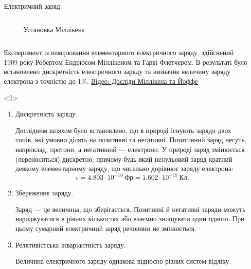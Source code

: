 \documentclass{beamer}
\begin{document}
\begin{frame}{Електричний заряд}
\begin{onlyenv}
\begin{columns}
\begin{column}{0.4\linewidth}
\begin{figure}
					\caption{Установка Міллікена}
				\end{figure}
			\end{column}
		\end{columns}
		\begin{block}{}\justifying\scriptsize
			Експеримент із вимірювання елементарного електричного заряду,
			здійснений 1909 року Робертом Ендрюсом Міллікеном та Гарві
			Флетчером. В результаті було встановлено дискретність електричного
			заряду та визначив величину заряду електрона з точністю до 1\%.
			\href{https://www.youtube.com/watch?v=5LC4-ct_1-M}{\scriptsize
				Відео: Досліди Міллікена та Йоффе}
		\end{block}
	\end{onlyenv}

	\begin{onlyenv}
		\begin{enumerate}\justifying
			\item Дискретність заряду.

			      \begin{flushleft}\scriptsize
				      Дослідним шляхом було встановлено, що в природі існують \alert{заряди двох типів}, які умовно ділять на \alert{позитивні} та
				      \alert{негативні}. Позитивний заряд несуть, наприклад, протони, а негативний --- електрони. У природі заряд змінюється (переноситься)
				      дискретно, причому будь-який ненульовий заряд кратний деякому елементарному заряду, що чисельно дорівнює заряду електрона:
				      \begin{equation*}
					      e = 4.803 \cdot 10^{-10}\ \text{Фр} = 1.602 \cdot 10^{-19}\ \text{Кл}.
				      \end{equation*}
			      \end{flushleft}

			\item Збереження заряду.

			      \begin{flushleft}\scriptsize
				      Заряд --- це величина, що \alert{зберігається}. Позитивні й негативні заряди можуть народжуватися в рівних кількостях або взаємно
				      знищувати один одного. При цьому сумарний електричний заряд речовини не змінюється.
			      \end{flushleft}
			\item Релятивістська інваріантність заряду.

			      \begin{flushleft}\scriptsize
				      Величина електричного заряду однакова відносно різних систем відліку.
			      \end{flushleft}
		\end{enumerate}
	\end{onlyenv}
\end{frame}
\end{document}
